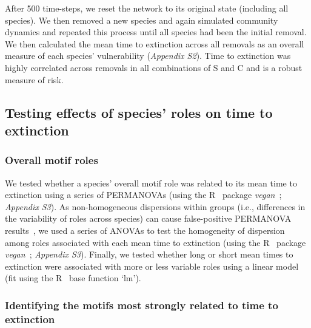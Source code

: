 \documentclass[12pt]{article}
\begin{document}
\begin{spacing}{2.0}
            After 500 time-steps, we reset the network to its original state (including all species). 
            We then removed a new species and again simulated community dynamics and repeated this process until all species had been the initial removal.
    		We then calculated the mean time to extinction across all removals as an overall measure of each species' vulnerability (\emph{Appendix S2}). 
    		Time to extinction was highly correlated across removals in all combinations of S and C and is a robust measure of risk.


	\subsection*{Testing effects of species' roles on time to extinction}

		\subsubsection*{Overall motif roles}

            We tested whether a species' overall motif role was related to its mean time to extinction using a series of PERMANOVAs (using the R~\citep{R} package \emph{vegan}~\citep{vegan}; \emph{Appendix S3}).
            As non-homogeneous dispersions within groups (i.e., differences in the variability of roles across species) can cause false-positive PERMANOVA results~\citep{Anderson2001}, we used a series of ANOVAs to test the homogeneity of dispersion among roles associated with each mean time to extinction (using the R~\citep{R} package \emph{vegan}~\citep{vegan}; \emph{Appendix S3}).
            Finally, we tested whether long or short mean times to extinction were associated with more or less variable roles  using a linear model (fit using the R~\citep{R} base function `lm').


		\subsubsection*{Identifying the motifs most strongly related to time to extinction}


\end{spacing}
\end{document}

